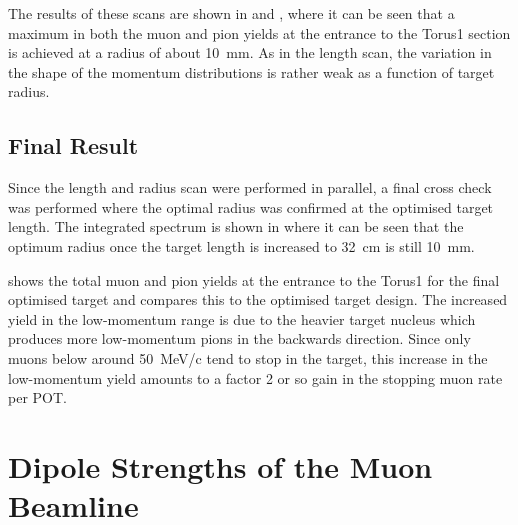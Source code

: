 The results of these scans are shown in  and ,
where it can be seen that a maximum in both the muon and pion yields at the entrance to the Torus1 section is achieved at a radius of about 10~mm.
As in the length scan, the variation in the shape of the momentum distributions is rather weak as a function of target radius.

\subsection{Final Result}
\FigOptimProdTgtFinal
\FigOptimProdTgtComparePhases
Since the length and radius scan were performed in parallel, a final cross check was performed where the optimal radius was confirmed at the optimised target length.
The integrated spectrum is shown in  where it can be seen that the optimum radius once the target length is increased to 32~cm is still 10~mm.

 shows the total muon and pion yields at the entrance to the Torus1 for the final optimised \phaseII target and compares this to the optimised \phaseI target design.
The increased yield in the low-momentum range is due to the heavier target nucleus which produces more low-momentum pions in the backwards direction.
Since only muons below around 50~MeV/c tend to stop in the target, this increase in the low-momentum yield amounts to a factor 2 or so gain in the stopping muon rate per POT.

\section{Dipole Strengths of the Muon Beamline}

